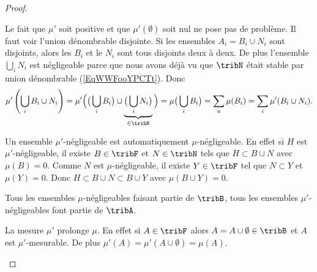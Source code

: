 \begin{proof}
\begin{subproof}

		Le fait que \( \mu'\) soit positive et que \( \mu'(\emptyset)\) soit nul ne pose pas de problème. Il faut voir l'union dénombrable disjointe. Si les ensembles \( A_i=B_i\cup N_i\) sont disjoints, alors les \( B_i\) et le \( N_i\) sont tous disjoints deux à deux. De plus l'ensemble \( \bigcup_iN_i\) est négligeable parce que nous avons déjà vu que \( \tribN\) était stable par union dénombrable (\ref{EqWWFooYPCTt}). Donc
		\begin{equation}
			\mu'\left( \bigcup_i B_i\cup N_i \right)=\mu'\Big( \big( \bigcup_iB_i \big)\cup\underbrace{\big( \bigcup_iN_i \big)}_{\in\tribN} \Big)=\mu\big( \bigcup_iB_i \big)=\sum_u\mu(B_i)=\sum_i\mu'(B_i\cup N_i).
		\end{equation}

		Un ensemble \( \mu'\)-négligeable est automatiquement \( \mu\)-négligeable. En effet si \( H\) est \( \mu'\)-négligeable, il existe \( B\in\tribF\) et \( N\in\tribN\) tels que \( H\subset B\cup N\) avec \( \mu(B)=0\). Comme \( N\) est \( \mu\)-négligeable, il existe \( Y\in\tribF\) tel que \( N\subset Y\) et \( \mu(Y)=0\). Donc \( H\subset B\cup N\subset B\cup Y\) avec \( \mu(B\cup Y)=0\).

		Tous les ensembles \( \mu\)-négligeables faisant partie de \( \tribB\), tous les ensembles \( \mu'\)-négligeables font partie de \( \tribA\).

		\spitem[Prolongement]
		La mesure \( \mu'\) prolonge \( \mu\). En effet si \( A\in\tribF\) alors \( A=A\cup\emptyset\in\tribB\) et \( A\) est \( \mu'\)-mesurable. De plus \( \mu'(A)=\mu'(A\cup\emptyset)=\mu(A)\).
		\spitem[Minimalité]


\end{subproof}
\end{proof}
